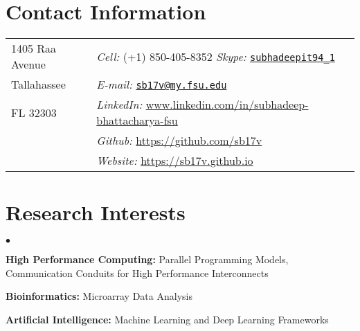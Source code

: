 \documentclass[margin,line]{res}
\newenvironment{list2}{
  \begin{list}{$\bullet$}{%
      \setlength{\itemsep}{0in}
      \setlength{\parsep}{0in} \setlength{\parskip}{0in}
      \setlength{\topsep}{0in} \setlength{\partopsep}{0in} 
      \setlength{\leftmargin}{0.2in}}}{\end{list}}
\begin{document}

\begin{resume}

\section{\sc Contact Information}
\begin{tabular}{@{}p{2in}p{4in}}
1405 Raa Avenue & {\it Cell:}  (+1) 850-405-8352 {\it Skype:}    
\href{https://join.skype.com/invite/S9OC09imwnsO}{\nolinkurl{subhadeepit94\_1}}\\
            
Tallahassee & {\it E-mail:} 
\href{mailto:sb17v@my.fsu.edu}{\nolinkurl{sb17v@my.fsu.edu} } \\
FL 32303 & {\it 
LinkedIn:} \url{www.linkedin.com/in/subhadeep-bhattacharya-fsu}
 \\
 & {\it Github:} \url{https://github.com/sb17v} \\
 & {\it Website:} \url{https://sb17v.github.io} \\
\end{tabular}

\vspace*{-.18in}



\section{\sc Research Interests}
\begin{list2}
	\item \textbf{High Performance Computing:} Parallel Programming Models, 
	Communication Conduits for High Performance Interconnects
	\item \textbf{Bioinformatics:} Microarray Data Analysis
	\item \textbf{Artificial Intelligence:} Machine Learning and Deep Learning 
	Frameworks
\end{list2}


\end{resume}
\end{document}
